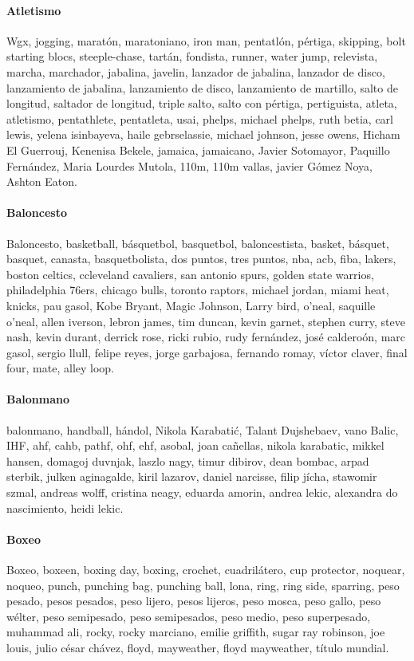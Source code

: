 \documentclass[../all.tex]{subfiles}
\begin{document}
    \paragraph{Atletismo}
    Wgx, jogging, maratón, maratoniano, iron man, pentatlón, pértiga, skipping, bolt starting blocs, steeple-chase, tartán, fondista, runner, water jump, relevista, marcha, marchador, jabalina, javelin, lanzador de jabalina, lanzador de disco, lanzamiento de jabalina, lanzamiento de disco, lanzamiento de martillo, salto de longitud,
    saltador de longitud, triple salto, salto con pértiga, pertiguista, atleta, atletismo, pentathlete, pentatleta, usai, phelps, michael phelps, ruth betia, carl lewis, yelena isinbayeva, haile gebrselassie, michael johnson, jesse owens, Hicham El Guerrouj, Kenenisa Bekele, jamaica, jamaicano, Javier Sotomayor, Paquillo Fernández, Maria Lourdes Mutola, 110m, 110m vallas, javier Gómez Noya, Ashton Eaton.
    \paragraph{Baloncesto}
    Baloncesto, basketball, básquetbol, basquetbol, baloncestista, basket, básquet, basquet, canasta, basquetbolista, dos puntos, tres puntos, nba, acb, fiba, lakers, boston celtics, ccleveland cavaliers, san antonio spurs, golden state warrios, philadelphia 76ers, chicago bulls, toronto raptors, michael jordan, miami heat, knicks, pau gasol, Kobe Bryant,  Magic Johnson,  Larry bird,  o'neal, saquille o'neal, allen iverson, lebron james, tim duncan, kevin garnet, stephen curry, steve nash, kevin durant, derrick rose, ricki rubio, rudy fernández, josé calderoón, marc gasol, sergio llull, felipe reyes, jorge garbajosa, fernando romay, víctor claver, final four, mate, alley loop.
    \paragraph{Balonmano}
    balonmano, handball, hándol, Nikola Karabatić, Talant Dujshebaev, vano Balic, IHF, ahf, cahb, pathf, ohf, ehf, asobal, joan cañellas, nikola karabatic, mikkel hansen, domagoj duvnjak, laszlo nagy, timur dibirov, dean bombac, arpad sterbik, julken aginagalde, kiril lazarov, daniel narcisse, filip jícha, stawomir szmal, andreas wolff, cristina neagy, eduarda amorin, andrea lekic, alexandra do nascimiento, heidi lekic.
    \paragraph{Boxeo}
    Boxeo, boxeen, boxing day, boxing,  crochet, cuadrilátero, cup protector, noquear, noqueo, punch, punching bag, punching ball, lona, ring, ring side, sparring, peso pesado, pesos pesados, peso lijero, pesos lijeros, peso mosca, peso gallo, peso wélter, peso semipesado, peso semipesados, peso medio, peso superpesado, muhammad ali, rocky, rocky marciano, emilie griffith, sugar ray robinson, joe louis, julio césar chávez, floyd, mayweather, floyd mayweather, título mundial.
\end{document}
